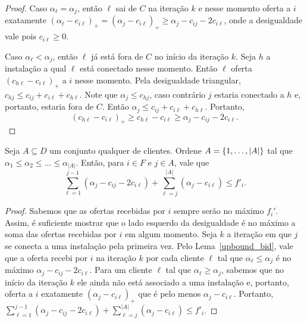 \begin{proof}
Caso $\alpha_\ell = \alpha_j$, então $\ell$ sai de $C$ na iteração $k$ e nesse momento oferta a $i$ exatamente $(\alpha_\ell - c_{i\ell})_+ = (\alpha_j - c_{i\ell})_+ \geq \alpha_j - c_{ij} - 2c_{i\ell}$, onde a desigualdade vale pois $c_{i\ell} \geq 0$.

Caso $\alpha_\ell < \alpha_j $, então $\ell$ já está fora de $C$ no início da iteração $k$. 
Seja $h$ a instalação a qual $\ell$ está conectado nesse momento. 
Então $\ell$ oferta $(c_{h\ell} - c_{i\ell})_+$ a $i$ nesse momento. 
Pela desigualdade triangular, $c_{hj} \leq c_{ij} + c_{i\ell} + c_{h\ell}$. 
Note que $\alpha_j \leq c_{hj}$, caso contrário $j$ estaria conectado a $h$ e, portanto, estaria fora de $C$. Então $\alpha_j \leq c_{ij} + c_{i\ell } + c_{h\ell}$. 
Portanto,
\[ (c_{h\ell} - c_{i\ell})_+ \geq c_{h\ell} - c_{i\ell} \geq \alpha_j - c_{ij} - 2c_{i\ell}.
\]
\end{proof}
\begin{lemma}
\label{lowerbound_fcost}
Seja $A \subseteq D$ um conjunto qualquer de clientes. Ordene $A = \{1,\ldots,|A|\}$ tal que $\alpha_1 \leq \alpha_2 \leq \ldots \leq \alpha_{|A|}$. Então, para $i \in F$ e $j \in A$, vale que
\[ \sum_{\ell=1}^{j-1}(\alpha_j - c_{ij} - 2c_{i\ell}) + \sum_{\ell= j}^{|A|}(\alpha_j - c_{i\ell}) \leq f'_i.
\]
\end{lemma}
\begin{proof}
Sabemos que as ofertas recebidas por $i$ sempre serão no máximo $f_i'$. Assim, é suficiente mostrar que o lado esquerdo da desigualdade é no máximo a soma das ofertas recebidas por $i$ em algum momento. Seja $k$ a iteração em que $j$ se conecta a uma instalação pela primeira vez. Pelo Lema~\ref{upbound_bid}, vale que a oferta recebi por $i$ na iteração $k$ por cada cliente $\ell$ tal que $\alpha_\ell \leq \alpha_j$ é no máximo $\alpha_j - c_{ij} - 2c_{i\ell}$. Para um cliente $\ell$ tal que $\alpha_\ell \geq \alpha_j$, sabemos que no início da iteração $k$ ele ainda não está associado a uma instalação e, 
portanto, oferta a $i$ exatamente $(\alpha_j - c_{i\ell})_+$  que é pelo menos $\alpha_j - c_{i\ell}$. Portanto, $\sum_{\ell=1}^{j-1}(\alpha_j - c_{ij} - 2c_{i\ell}) + \sum_{\ell= j}^{|A|}(\alpha_j - c_{i\ell}) \leq f'_i$.

\end{proof}


